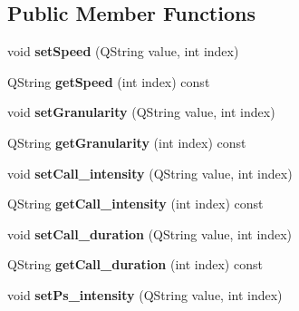 \subsection*{Public Member Functions}
\begin{DoxyCompactItemize}
\item 
void {\bfseries set\+Speed} (Q\+String value, int index)\hypertarget{class_tuningtraffic_ae3df4f4615222dba0933cf1cbcbc7acc}{}\label{class_tuningtraffic_ae3df4f4615222dba0933cf1cbcbc7acc}

\item 
Q\+String {\bfseries get\+Speed} (int index) const \hypertarget{class_tuningtraffic_a8b5da9423dc72156efb188e26b1049f8}{}\label{class_tuningtraffic_a8b5da9423dc72156efb188e26b1049f8}

\item 
void {\bfseries set\+Granularity} (Q\+String value, int index)\hypertarget{class_tuningtraffic_a2052678c44c7e1d9c0e064542fcb82c4}{}\label{class_tuningtraffic_a2052678c44c7e1d9c0e064542fcb82c4}

\item 
Q\+String {\bfseries get\+Granularity} (int index) const \hypertarget{class_tuningtraffic_a9bc0c11c2e404148944b73b6abd3ebd0}{}\label{class_tuningtraffic_a9bc0c11c2e404148944b73b6abd3ebd0}

\item 
void {\bfseries set\+Call\+\_\+intensity} (Q\+String value, int index)\hypertarget{class_tuningtraffic_a33bd0d2fadc201f0821f2357e6b2e752}{}\label{class_tuningtraffic_a33bd0d2fadc201f0821f2357e6b2e752}

\item 
Q\+String {\bfseries get\+Call\+\_\+intensity} (int index) const \hypertarget{class_tuningtraffic_a16ffc0a2aff2c3e39f2face11b9a74eb}{}\label{class_tuningtraffic_a16ffc0a2aff2c3e39f2face11b9a74eb}

\item 
void {\bfseries set\+Call\+\_\+duration} (Q\+String value, int index)\hypertarget{class_tuningtraffic_a02612a2b556681f626204a79d6c088c7}{}\label{class_tuningtraffic_a02612a2b556681f626204a79d6c088c7}

\item 
Q\+String {\bfseries get\+Call\+\_\+duration} (int index) const \hypertarget{class_tuningtraffic_a1b82609978198890cdd1930b920d092c}{}\label{class_tuningtraffic_a1b82609978198890cdd1930b920d092c}

\item 
void {\bfseries set\+Ps\+\_\+intensity} (Q\+String value, int index)\hypertarget{class_tuningtraffic_a69c71b219330a27721395887a370fe67}{}\label{class_tuningtraffic_a69c71b219330a27721395887a370fe67}


\end{DoxyCompactItemize}
